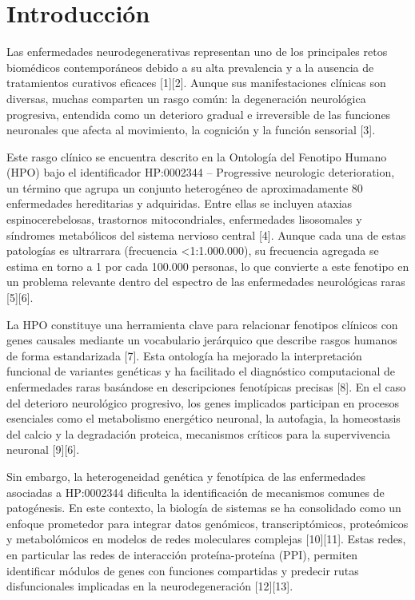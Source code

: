 \section{Introducción}

Las enfermedades neurodegenerativas representan uno de los principales retos biomédicos contemporáneos debido a su alta prevalencia y a la ausencia de tratamientos curativos eficaces [1][2]. Aunque sus manifestaciones clínicas son diversas, muchas comparten un rasgo común: la degeneración neurológica progresiva, entendida como un deterioro gradual e irreversible de las funciones neuronales que afecta al movimiento, la cognición y la función sensorial [3].

Este rasgo clínico se encuentra descrito en la Ontología del Fenotipo Humano (HPO) bajo el identificador HP:0002344 – Progressive neurologic deterioration, un término que agrupa un conjunto heterogéneo de aproximadamente 80 enfermedades hereditarias y adquiridas. Entre ellas se incluyen ataxias espinocerebelosas, trastornos mitocondriales, enfermedades lisosomales y síndromes metabólicos del sistema nervioso central [4]. Aunque cada una de estas patologías es ultrarrara (frecuencia <1:1.000.000), su frecuencia agregada se estima en torno a 1 por cada 100.000 personas, lo que convierte a este fenotipo en un problema relevante dentro del espectro de las enfermedades neurológicas raras [5][6].

La HPO constituye una herramienta clave para relacionar fenotipos clínicos con genes causales mediante un vocabulario jerárquico que describe rasgos humanos de forma estandarizada [7]. Esta ontología ha mejorado la interpretación funcional de variantes genéticas y ha facilitado el diagnóstico computacional de enfermedades raras basándose en descripciones fenotípicas precisas [8]. En el caso del deterioro neurológico progresivo, los genes implicados participan en procesos esenciales como el metabolismo energético neuronal, la autofagia, la homeostasis del calcio y la degradación proteica, mecanismos críticos para la supervivencia neuronal [9][6].

Sin embargo, la heterogeneidad genética y fenotípica de las enfermedades asociadas a HP:0002344 dificulta la identificación de mecanismos comunes de patogénesis. En este contexto, la biología de sistemas se ha consolidado como un enfoque prometedor para integrar datos genómicos, transcriptómicos, proteómicos y metabolómicos en modelos de redes moleculares complejas [10][11]. Estas redes, en particular las redes de interacción proteína-proteína (PPI), permiten identificar módulos de genes con funciones compartidas y predecir rutas disfuncionales implicadas en la neurodegeneración [12][13].

